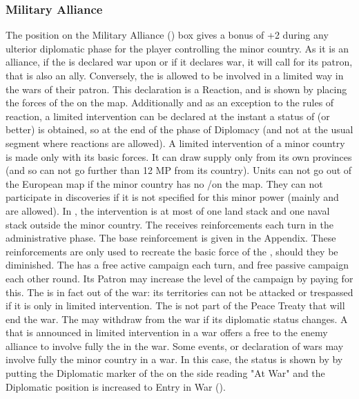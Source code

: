 \subsubsection{Military Alliance}
\aparag The position on the Military Alliance (\AM) box gives a bonus of +2
during any ulterior diplomatic phase for the player controlling the minor
country.
\aparag[Alliance.] As it is an alliance, if the \MIN is declared war upon or
if it declares war, it will call for its patron, that is also an ally.
Conversely, the \MIN is allowed to be involved in a limited way in the wars of
their patron. This declaration is a Reaction, and is shown by placing the
forces of the \MIN on the map. Additionally and as an exception to the rules
of reaction, a limited intervention can be declared at the instant a status of
\AM (or better) is obtained, so at the end of the phase of Diplomacy (and not
at the usual segment where reactions are allowed).
\bparag A limited intervention of a minor country is made only with its basic
forces. It can draw supply only from its own provinces (and so can not go
further than 12 MP from its country).
\bparag Units can not go out of the European map if the minor country has no
\TP/\COL on the \ROTW map. They can not participate in discoveries if it is
not specified for this minor power (mainly  and 
are allowed).
\bparag In \AM, the intervention is at most of one land stack and one naval
stack outside the minor country.
\bparag The \MIN receives reinforcements each turn in the administrative
phase. The base reinforcement is given in the Appendix. These reinforcements
are only used to recreate the basic force of the \MIN, should they be
diminished.
\bparag The \MIN has a free active campaign each turn, and free passive
campaign each other round. Its Patron may increase the level of the campaign
by paying for this.
\bparag The \MIN is in fact out of the war: its territories can not be
attacked or trespassed if it is only in limited intervention.  The \MIN is not
part of the Peace Treaty that will end the war. The \MIN may withdraw from the
war if its diplomatic status changes.
\bparag A \MIN that is announced in limited intervention in a war offers a
free \CB to the enemy alliance to involve fully the \MIN in the war.
Some events, or declaration of wars may involve fully the minor country in a
war.
\bparag In this case, the status is shown by by putting the Diplomatic marker
of the \MIN on the side reading "At War" and the Diplomatic position is
increased to Entry in War (\EW).


